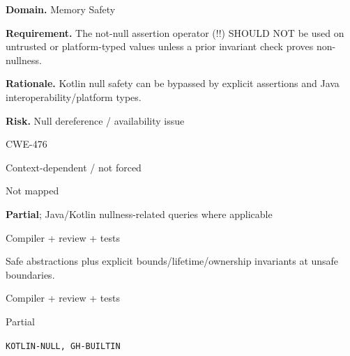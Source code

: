 \documentclass[10pt,letterpaper]{article}
\newcommand{\prioritybadge}[2]{\tcbox[on line,boxrule=0pt,arc=1.2mm,boxsep=0.7mm,left=1mm,right=1mm,top=0.4mm,bottom=0.4mm,colback=#2!12,coltext=#2]{\scriptsize\bfseries #1}}
\begin{document}
\begin{rulebox}[title={\texttt{SCS-KOTLIN-MEM-001} \hfill \prioritybadge{High Priority}{High}}]
\textbf{Domain.} Memory Safety

\textbf{Requirement.} The not-null assertion operator (!!) SHOULD NOT be used on untrusted or platform-typed values unless a prior invariant check proves non-nullness.

\textbf{Rationale.} Kotlin null safety can be bypassed by explicit assertions and Java interoperability/platform types.

\textbf{Risk.} Null dereference / availability issue

\begin{description}[leftmargin=2.65cm,labelwidth=2.3cm,style=nextline,itemsep=1pt,topsep=3pt]
  \item[CWE] CWE-476
  \item[OWASP] Context-dependent / not forced
  \item[CERT] Not mapped
  \item[CodeQL] \textbf{Partial}; Java/Kotlin nullness-related queries where applicable
  \item[Enforcement] Compiler + review + tests
  \item[Prevention] Safe abstractions plus explicit bounds/lifetime/ownership invariants at unsafe boundaries.
  \item[Verification] Compiler + review + tests
  \item[Automation] Partial
  \item[Sources] \texttt{KOTLIN-NULL, GH-BUILTIN}
\end{description}
\end{rulebox}
\end{document}
